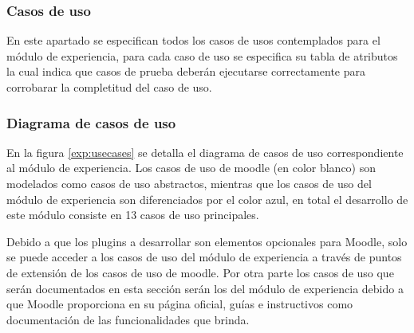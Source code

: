 

\clearpage
\subsubsection{Casos de uso} %

 En este apartado se especifican todos los casos de usos contemplados para el módulo de
 experiencia, para cada caso de uso se especifica su tabla de atributos la cual indica que casos
 de prueba deberán ejecutarse correctamente para corrobarar la completitud del caso de uso.

\subsubsection*{Diagrama de casos de uso}

 En la figura \ref{exp:usecases} se detalla el diagrama de casos de uso correspondiente al módulo
 de experiencia. Los casos de uso de moodle (en color blanco) son modelados como casos de uso
 abstractos, mientras que los casos de uso del módulo de experiencia son diferenciados por el
 color azul, en total el desarrollo de este módulo consiste en 13 casos de uso principales.


 \noindent
 Debido a que los plugins a desarrollar son elementos opcionales para Moodle, solo se puede
 acceder a los casos de uso del módulo de experiencia a través de puntos de extensión de los
 casos de uso de moodle. Por otra parte los casos de uso que serán documentados en esta sección
 serán los del módulo de experiencia debido a que Moodle proporciona en su página oficial, guías
 e instructivos como documentación de las funcionalidades que brinda.

